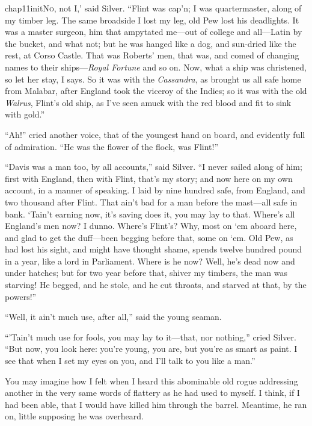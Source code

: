
\lettrine[ante=`,lines=4,image=true]{chap11initN}{o}, not I,' said Silver. \enquote{Flint was cap’n; I was quartermaster, along of my timber leg. The same broadside I lost my leg, old Pew lost his deadlights. It was a master surgeon, him that ampytated me---out of college and all---Latin by the bucket, and what not; but he was hanged like a dog, and sun-dried like the rest, at Corso Castle. That was Roberts’ men, that was, and comed of changing names to their ships---\textit{Royal Fortune} and so on. Now, what a ship was christened, so let her stay, I says. So it was with the \textit{Cassandra}, as brought us all safe home from Malabar, after England took the viceroy of the Indies; so it was with the old \textit{\textit{Walrus}}, Flint’s old ship, as I’ve seen amuck with the red blood and fit to sink with gold.}

\enquote{Ah!} cried another voice, that of the youngest hand on board, and evidently full of admiration. \enquote{He was the flower of the flock, was Flint!}

\enquote{Davis was a man too, by all accounts,} said Silver. \enquote{I never sailed along of him; first with England, then with Flint, that’s my story; and now here on my own account, in a manner of speaking. I laid by nine hundred safe, from England, and two thousand after Flint. That ain’t bad for a man before the mast---all safe in bank. `Tain’t earning now, it’s saving does it, you may lay to that. Where’s all England’s men now? I dunno. Where’s Flint’s? Why, most on `em aboard here, and glad to get the duff---been begging before that, some on `em. Old Pew, as had lost his sight, and might have thought shame, spends twelve hundred pound in a year, like a lord in Parliament. Where is he now? Well, he’s dead now and under hatches; but for two year before that, shiver my timbers, the man was starving! He begged, and he stole, and he cut throats, and starved at that, by the powers!}

\enquote{Well, it ain’t much use, after all,} said the young seaman.

\enquote{’Tain’t much use for fools, you may lay to it---that, nor nothing,} cried Silver. \enquote{But now, you look here: you’re young, you are, but you’re as smart as paint. I see that when I set my eyes on you, and I’ll talk to you like a man.}

You may imagine how I felt when I heard this abominable old rogue addressing another in the very same words of flattery as he had used to myself. I think, if I had been able, that I would have killed him through the barrel. Meantime, he ran on, little supposing he was overheard.

